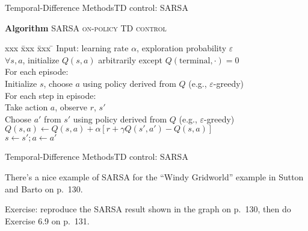\documentclass{beamer}
\begin{document}
\begin{frame}{Temporal-Difference Methods}{TD control: SARSA}

  \begin{block}{\textbf{Algorithm} \textsc{SARSA on-policy TD control}}
  \begin{tabbing}
    xxx \= xxx \= xxx \= \kill
    \> Input: learning rate $\alpha$, exploration probability $\varepsilon$ \\
    \> $\forall s, a$, initialize $Q(s,a)$ arbitrarily
    except $Q(\mathrm{terminal},\cdot) = 0$ \\
    \> For each episode: \\
    \> \> Initialize $s$, choose $a$ using policy derived from $Q$ (e.g., $\varepsilon$-greedy) \\
    \> \> For each step in episode: \\
    \> \> \> Take action $a$, observe $r$, $s'$ \\
    \> \> \> Choose $a'$ from $s'$ using policy derived from $Q$ (e.g., $\varepsilon$-greedy) \\
    \> \> \> $Q(s,a) \leftarrow Q(s,a) + \alpha \left[ r + \gamma Q(s', a') - Q(s, a) \right]$ \\
    \> \> \> $s \leftarrow s'; a \leftarrow a'$
  \end{tabbing}
  \end{block}

\end{frame}


\begin{frame}{Temporal-Difference Methods}{TD control: SARSA}

  There's a nice example of SARSA for the ``Windy Gridworld'' example
  in Sutton and Barto on p.\ 130.

  \medskip

  \alert{Exercise:} reproduce the SARSA result shown in the graph on
  p.\ 130, then do Exercise 6.9 on p.\ 131.

\end{frame}
\end{document}
